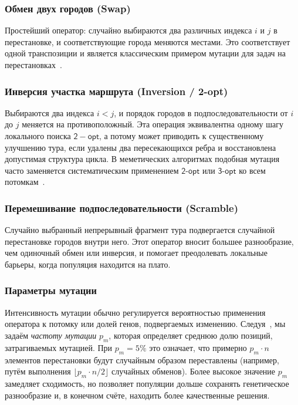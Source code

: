\documentclass[a4paper,12pt]{article}
\begin{document}
\subsubsection{Обмен двух городов (Swap)}

Простейший оператор: случайно выбираются два различных индекса $i$ и $j$ в перестановке,
и соответствующие города меняются местами. Это соответствует одной транспозиции и
является классическим примером мутации для задач на перестановках~\cite{taillard2023design}.

\subsubsection{Инверсия участка маршрута (Inversion / 2-opt)}

Выбираются два индекса $i < j$, и порядок городов в подпоследовательности от $i$ до $j$
меняется на противоположный. Эта операция эквивалентна одному шагу локального поиска
$\mathsf{2-opt}$, а потому может приводить к существенному улучшению тура, если удалены два
пересекающихся ребра и восстановлена допустимая структура цикла. В меметических
алгоритмах подобная мутация часто заменяется систематическим применением $\mathsf{2\mbox{-}opt}$ или
$\mathsf{3\mbox{-}opt}$ ко всем потомкам~\cite{gendreau2010handbook}.

\subsubsection{Перемешивание подпоследовательности (Scramble)}

Случайно выбранный непрерывный фрагмент тура подвергается случайной перестановке
городов внутри него. Этот оператор вносит большее разнообразие, чем одиночный обмен
или инверсия, и помогает преодолевать локальные барьеры, когда популяция находится
на плато.

\subsubsection{Параметры мутации}

Интенсивность мутации обычно регулируется вероятностью применения оператора к потомку
или долей генов, подвергаемых изменению. Следуя~\cite{gendreau2010handbook}, мы задаём
\textit{частоту мутации} $p_m$, которая определяет среднюю долю позиций, затрагиваемых
мутацией. При $p_m=5\%$ это означает, что примерно $p_m \cdot n$ элементов перестановки
будут случайным образом переставлены (например, путём выполнения $\lfloor p_m \cdot n/2\rfloor$
случайных обменов). Более высокое значение $p_m$ замедляет сходимость, но позволяет
популяции дольше сохранять генетическое разнообразие и, в конечном счёте, находить
более качественные решения.
\end{document}
